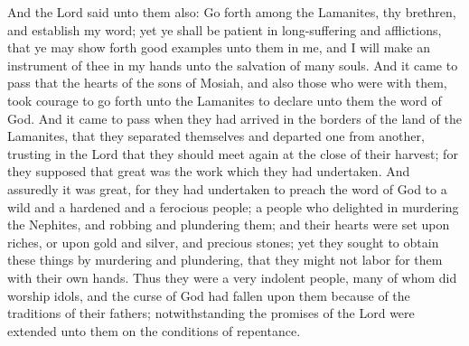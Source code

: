And the Lord said unto them also: Go forth among the Lamanites, thy brethren, and establish my word; yet ye shall be patient in long-suffering and afflictions, that ye may show forth good examples unto them in me, and I will make an instrument of thee in my hands unto the salvation of many souls.
\bverse \iffalse And it came to pass that the hearts of the sons of Mosiah, and also those who were with them, took courage to go forth unto the Lamanites to declare unto them the word of God. \fi
And it came to pass that the hearts of the sons of Mosiah, and also those who were with them, took courage to go forth unto the Lamanites to declare unto them the word of God.
\bverse \iffalse And it came to pass when they had arrived in the borders of the land of the Lamanites, that they separated themselves and departed one from another, trusting in the Lord that they should meet again at the close of their harvest; for they supposed that great was the work which they had undertaken. \fi
And it came to pass when they had arrived in the borders of the land of the Lamanites, that they separated themselves and departed one from another, trusting in the Lord that they should meet again at the close of their harvest; for they supposed that great was the work which they had undertaken.
\bverse \iffalse And assuredly it was great, for they had undertaken to preach the word of God to a wild and a hardened and a ferocious people; a people who delighted in murdering the Nephites, and robbing and plundering them; and their hearts were set upon riches, or upon gold and silver, and precious stones; yet they sought to obtain these things by murdering and plundering, that they might not labor for them with their own hands. \fi
And assuredly it was great, for they had undertaken to preach the word of God to a wild and a hardened and a ferocious people; a people who delighted in murdering the Nephites, and robbing and plundering them; and their hearts were set upon riches, or upon gold and silver, and precious stones; yet they sought to obtain these things by murdering and plundering, that they might not labor for them with their own hands.
\bverse \iffalse Thus they were a very indolent people, many of whom did worship idols, and the curse of God had fallen upon them because of the traditions of their fathers; notwithstanding the promises of the Lord were extended unto them on the conditions of repentance. \fi
Thus they were a very indolent people, many of whom did worship idols, and the curse of God had fallen upon them because of the traditions of their fathers; notwithstanding the promises of the Lord were extended unto them on the conditions of repentance.
